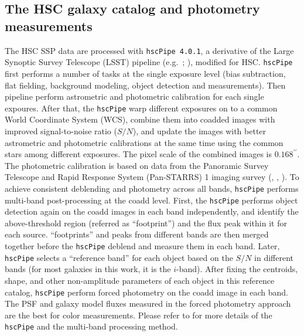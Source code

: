 \documentclass{emulateapj}
\def\arcsec{{\prime\prime}}
\begin{document}
\begin{CJK*}{UTF8}{gbsn}
\subsection{The HSC galaxy catalog and photometry measurements}
    \label{sec:pipeline}

    The HSC SSP data are processed with \texttt{hscPipe 4.0.1}, a derivative of the Large 
    Synoptic Survey Telescope (LSST) pipeline (e.g.\ \citealt{Juric2015}; 
    \citealt{Axelrod2010}), modified for HSC. 
    \texttt{hscPipe} first performs a number of tasks at the single exposure level 
    (bias subtraction, flat fielding, background modeling, object detection and 
    measurements). 
    Then pipeline perform astrometric and photometric calibration for each single 
    expoures. 
    After that, the \texttt{hscPipe} warp different exposures on to a common
    World Coordinate System (WCS), combine them into coadded images with improved 
    signal-to-noise ratio ($S/N$), and update the images with better astrometric and 
    photometric calibrations at the same time using the common stars among different
    exposures.
    The pixel scale of the combined images is $0.168^{\arcsec}$.  
    The photometric calibration is based on data from the Panoramic Survey Telescope 
    and Rapid Response System (Pan-STARRS) 1 imaging survey 
    (\citealt{Schlafly2012}, \citealt{Tonry2012}, \citealt{Magnier2013}). 
    To achieve consistent deblending and photometry across all bands, \texttt{hscPipe} 
    performs multi-band post-processing at the coadd level. 
    First, the \texttt{hscPipe} performs object detection again on the coadd images
    in each band independently, and identify the above-threshold region (referred as 
    ``footprint'') and the flux peak within it for each source. 
    ``footprints'' and peaks from different bands are then merged together before 
    the \texttt{hscPipe} deblend and measure them in each band. 
    Later, \texttt{hscPipe} selects a ``reference band'' for each object based on the 
    $S/N$ in different bands (for most galaxies in this work, it is the $i$-band). 
    After fixing the centroids, shape, and other non-amplitude parameters of each 
    object in this reference catalog, \texttt{hscPipe} perform forced photometry 
    on the coadd image in each band.
    The PSF and galaxy model fluxes measured in the forced photometry approach are the
    best for color measurements.  
    Please refer to \citet{BoschInPrep} for more details of the \texttt{hscPipe} and 
    the multi-band processing method.    
          

\end{CJK*}
\end{document}

